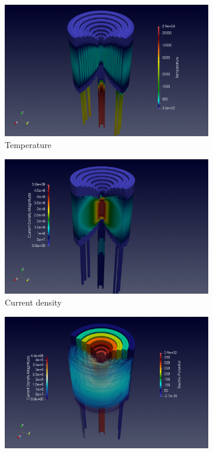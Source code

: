 \begin{figure}[h]
  \centering
  \begin{subfigure}[c]{0.49\textwidth}
    \centering
    \includegraphics[width=\textwidth]{graphics/feelpp/feelpp-benchmark-HL-31-temperature.png}
    \caption{Temperature}
  \end{subfigure}
  \hfill
  \begin{subfigure}[c]{0.49\textwidth}
    \centering
    \includegraphics[width=\textwidth]{graphics/feelpp/feelpp-benchmark-HL-31-current_density.png}
    \caption{Current density}
  \end{subfigure}
  \begin{subfigure}[c]{0.49\textwidth}
    \centering
    \includegraphics[width=\textwidth]{graphics/feelpp/feelpp-benchmark-HL-31-potential_density_streamines.png}

\end{subfigure}
\end{figure}
